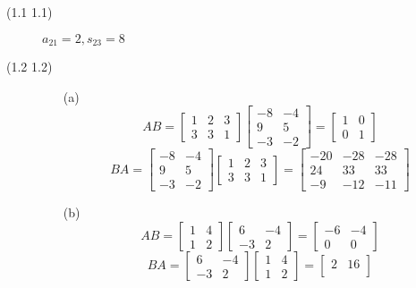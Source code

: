 \begin{description}
\item[(1.1 {\color{cBlue}1.1})]
{\color{cBlue}\textbullet}
$a_{21} = 2, s_{23} = 8$
\item[(1.2 {\color{cBlue}1.2})]
{\color{cBlue}\textbullet}
\begin{itemize}
\item[(a)]
$$AB = \begin{bmatrix}
1 & 2 & 3 \\
3 & 3 & 1
\end{bmatrix}\begin{bmatrix}
-8 & -4 \\
9 & 5 \\
-3 & -2
\end{bmatrix} = \begin{bmatrix}
1 & 0 \\
0 & 1
\end{bmatrix}$$
$$BA = \begin{bmatrix}
-8 & -4 \\
9 & 5 \\
-3 & -2
\end{bmatrix}\begin{bmatrix}
1 & 2 & 3 \\
3 & 3 & 1
\end{bmatrix} = \begin{bmatrix}
-20 & -28 & - 28 \\
24 & 33 & 33 \\
-9 & -12 & -11
\end{bmatrix}$$
\item[(b)]
$$AB = \begin{bmatrix}
1 & 4 \\
1 & 2
\end{bmatrix}\begin{bmatrix}
6 & -4 \\
-3 & 2
\end{bmatrix} = \begin{bmatrix}
-6 & -4 \\
0 & 0
\end{bmatrix}$$
$$BA = \begin{bmatrix}
6 & -4 \\
-3 & 2
\end{bmatrix}\begin{bmatrix}
1 & 4 \\
1 & 2
\end{bmatrix} = \begin{bmatrix}
2 & 16 \\

\end{bmatrix}$$
\end{itemize}
\end{description}
